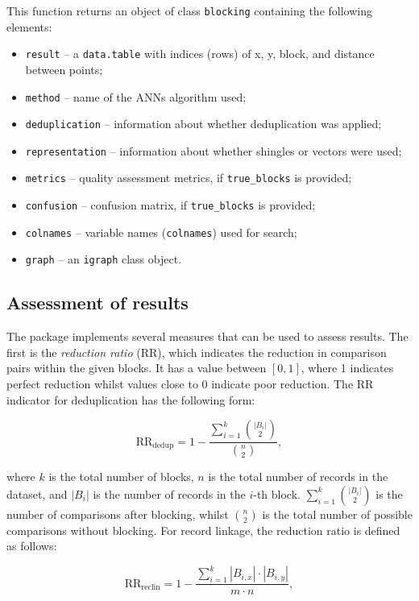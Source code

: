 This function returns an object of class \texttt{blocking} containing the
following elements:

\begin{itemize}
\tightlist
\item
  \texttt{result} -- a \texttt{data.table} with indices (rows) of x, y, block, and
  distance between points;
\item
  \texttt{method} -- name of the ANNs algorithm used;
\item
  \texttt{deduplication} -- information about whether deduplication was
  applied;
\item
  \texttt{representation} -- information about whether shingles or vectors
  were used;
\item
  \texttt{metrics} -- quality assessment metrics, if \texttt{true\_blocks} is
  provided;
\item
  \texttt{confusion} -- confusion matrix, if \texttt{true\_blocks} is provided;
\item
  \texttt{colnames} -- variable names (\texttt{colnames}) used for search;
\item
  \texttt{graph} -- an \texttt{igraph} class object.
\end{itemize}

\subsection{Assessment of results}\label{sec-assess}

The package implements several measures that can be used to assess
results. The first is the \emph{reduction ratio} (RR), which indicates the
reduction in comparison pairs within the given blocks. It has a value
between \([0,1]\), where 1 indicates perfect reduction whilst values close
to 0 indicate poor reduction. The RR indicator for deduplication has the
following form:

\[
\text{RR}_{\text{dedup}} = 1 - \frac{\sum\limits_{i=1}^{k} \binom{|B_i|}{2}}{\binom{n}{2}},
\]

\noindent where \(k\) is the total number of blocks, \(n\) is the total
number of records in the dataset, and \(|B_i|\) is the number of records
in the \(i\)-th block. \(\sum\limits_{i=1}^{k} \binom{|B_i|}{2}\) is the
number of comparisons after blocking, whilst \(\binom{n}{2}\) is the total
number of possible comparisons without blocking. For record linkage, the
reduction ratio is defined as follows:

\[
\text{RR}_{\text{reclin}} = 1 - \frac{\sum\limits_{i=1}^{k} |B_{i,x}| \cdot |B_{i,y}|} {m \cdot n},
\]

